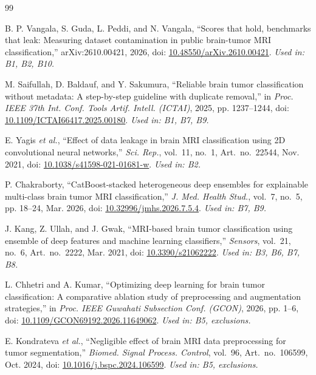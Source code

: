 \documentclass[11pt,a4paper]{article}
\begin{document}
\renewcommand{\refname}{}
\vspace{-2\baselineskip}
\begin{thebibliography}{99}

 B. P. Vangala, S. Guda, L. Peddi, and N. Vangala, ``Scores that hold, benchmarks that leak: Measuring dataset contamination in public brain-tumor MRI classification,'' arXiv:2610.00421, 2026, doi: \href{https://doi.org/10.48550/arXiv.2610.00421}{10.48550/arXiv.2610.00421}. \emph{Used in: B1, B2, B10.}

 M. Saifullah, D. Baldauf, and Y. Sakumura, ``Reliable brain tumor classification without metadata: A step-by-step guideline with duplicate removal,'' in \emph{Proc. IEEE 37th Int. Conf. Tools Artif. Intell. (ICTAI)}, 2025, pp. 1237--1244, doi: \href{https://doi.org/10.1109/ICTAI66417.2025.00180}{10.1109/ICTAI66417.2025.00180}. \emph{Used in: B1, B7, B9.}

 E. Yagis \emph{et al.}, ``Effect of data leakage in brain MRI classification using 2D convolutional neural networks,'' \emph{Sci. Rep.}, vol.~11, no.~1, Art.~no.~22544, Nov. 2021, doi: \href{https://doi.org/10.1038/s41598-021-01681-w}{10.1038/s41598-021-01681-w}. \emph{Used in: B2.}

 P. Chakraborty, ``CatBoost-stacked heterogeneous deep ensembles for explainable multi-class brain tumor MRI classification,'' \emph{J. Med. Health Stud.}, vol.~7, no.~5, pp. 18--24, Mar. 2026, doi: \href{https://doi.org/10.32996/jmhs.2026.7.5.4}{10.32996/jmhs.2026.7.5.4}. \emph{Used in: B7, B9.}

 J. Kang, Z. Ullah, and J. Gwak, ``MRI-based brain tumor classification using ensemble of deep features and machine learning classifiers,'' \emph{Sensors}, vol.~21, no.~6, Art.~no.~2222, Mar. 2021, doi: \href{https://doi.org/10.3390/s21062222}{10.3390/s21062222}. \emph{Used in: B3, B6, B7, B8.}

 L. Chhetri and A. Kumar, ``Optimizing deep learning for brain tumor classification: A comparative ablation study of preprocessing and augmentation strategies,'' in \emph{Proc. IEEE Guwahati Subsection Conf. (GCON)}, 2026, pp. 1--6, doi: \href{https://doi.org/10.1109/GCON69192.2026.11649062}{10.1109/GCON69192.2026.11649062}. \emph{Used in: B5, exclusions.}

 E. Kondrateva \emph{et al.}, ``Negligible effect of brain MRI data preprocessing for tumor segmentation,'' \emph{Biomed. Signal Process. Control}, vol.~96, Art.~no.~106599, Oct. 2024, doi: \href{https://doi.org/10.1016/j.bspc.2024.106599}{10.1016/j.bspc.2024.106599}. \emph{Used in: B5, exclusions.}


\end{thebibliography}
\end{document}
